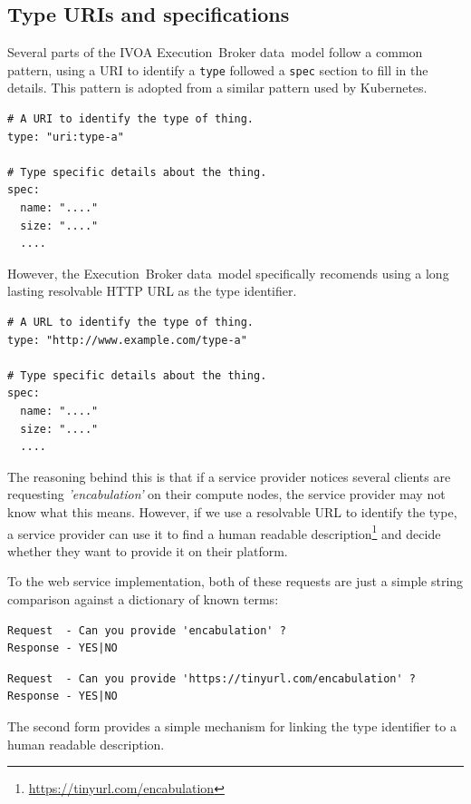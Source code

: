 \documentclass[11pt,a4paper]{ivoa}
\newcommand{\datamodel} {data~model}
\newcommand{\webservice} {web service}
\newcommand{\ivoa} {IVOA}
\newcommand{\executionbroker} {Execution~Broker}
\newcommand{\kubernetes} {Kubernetes}
\newcommand{\codeword}[1] {\texttt{#1}}
\newcommand{\footurl}[1] {\footnote{\url{#1}}}
\begin{document}
\subsection{Type URIs and specifications}
\label{type-and-spec}

Several parts of the \ivoa{} \executionbroker{} \datamodel{} follow a common pattern, using a URI
to identify a \codeword{type} followed a \codeword{spec} section to fill in the details.
This pattern is adopted from a similar pattern used by \kubernetes{}.

\begin{lstlisting}[]
# A URI to identify the type of thing.
type: "uri:type-a"

# Type specific details about the thing.
spec:
  name: "...."
  size: "...."
  ....
\end{lstlisting}

However, the \executionbroker{} \datamodel{} specifically recomends using a long lasting resolvable
HTTP URL as the type identifier.

\begin{lstlisting}[]
# A URL to identify the type of thing.
type: "http://www.example.com/type-a"

# Type specific details about the thing.
spec:
  name: "...."
  size: "...."
  ....
\end{lstlisting}

The reasoning behind this is that if a service provider notices several clients are requesting
\textit{'encabulation'} on their compute nodes, the service provider may not know what this means.
However, if we use a resolvable URL to identify the type, a service provider can use it to find a
human readable description\footurl{https://tinyurl.com/encabulation} and decide whether they want
to provide it on their platform.

To the \webservice{} implementation, both of these requests are just a simple string comparison against a
dictionary of known terms:

\begin{lstlisting}[]
Request  - Can you provide 'encabulation' ?
Response - YES|NO
\end{lstlisting}

\begin{lstlisting}[]
Request  - Can you provide 'https://tinyurl.com/encabulation' ?
Response - YES|NO
\end{lstlisting}

The second form provides a simple mechanism for linking the type identifier to a human readable description.
\end{document}
